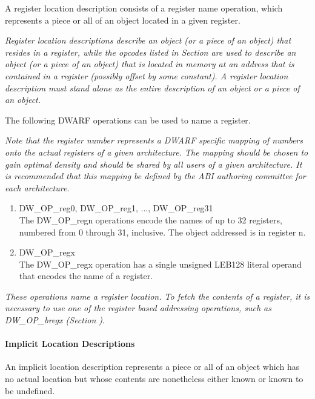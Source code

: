 A register location description consists of a register name
operation, which represents a piece or all of an object
located in a given register.

\textit{Register location descriptions describe an object
(or a piece of an object) that resides in a register, while
the opcodes listed in 
Section 
are used to describe an object (or a piece of
an object) that is located in memory at an address that is
contained in a register (possibly offset by some constant). A
register location description must stand alone as the entire
description of an object or a piece of an object.
}

The following DWARF operations can be used to name a register.


\textit{Note that the register number represents a DWARF specific
mapping of numbers onto the actual registers of a given
architecture. The mapping should be chosen to gain optimal
density and should be shared by all users of a given
architecture. It is recommended that this mapping be defined
by the ABI authoring committee for each architecture.
}
\begin{enumerate}[1]
\item DW\-\_OP\-\_reg0, DW\-\_OP\-\_reg1, ..., DW\-\_OP\-\_reg31 \\
The DW\-\_OP\-\_regn operations encode the names of up to 32
registers, numbered from 0 through 31, inclusive. The object
addressed is in register n.

\item DW\-\_OP\-\_regx \\
The DW\-\_OP\-\_regx operation has a single unsigned LEB128 literal
operand that encodes the name of a register.  
\end{enumerate}

\textit{These operations name a register location. To
fetch the contents of a register, it is necessary to use
one of the register based addressing operations, such as
DW\-\_OP\-\_bregx 
(Section )}.


\paragraph{Implicit Location Descriptions}

An implicit location description represents a piece or all
of an object which has no actual location but whose contents
are nonetheless either known or known to be undefined.

